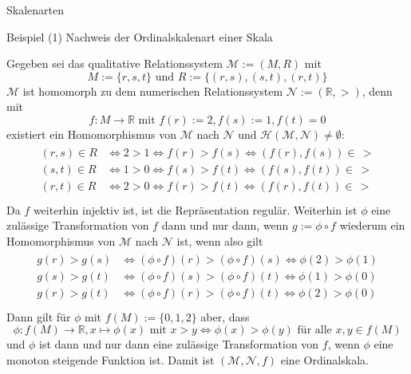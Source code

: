 \documentclass[
  8pt,
  ignorenonframetext,
]{beamer}
\begin{document}
\begin{frame}{Skalenarten}
\protect\hypertarget{skalenarten-2}{}
\vspace{1mm}
\small

Beispiel (1) Nachweis der Ordinalskalenart einer Skala

\footnotesize
{}

Gegeben sei das qualitative Relationssystem \(\mathcal{M} := (M,R)\) mit
\begin{equation}
M := \{r,s,t\} \mbox{ und } R := \{(r,s),(s,t),(r,t)\}
\end{equation} \(\mathcal{M}\) ist homomorph zu dem numerischen
Relationssystem \(\mathcal{N} := (\mathbb{R},>)\), denn mit
\begin{equation}
f : M \to \mathbb{R} \mbox{ mit } f(r) := 2, f(s) := 1, f(t) = 0
\end{equation} existiert ein Homomorphismus von \(\mathcal{M}\) nach
\(\mathcal{N}\) und
\(\mathcal{H}(\mathcal{M},\mathcal{N})\neq \emptyset\): \begin{align}
\begin{split}
(r,s) \in R & \Leftrightarrow 2 > 1 \Leftrightarrow f(r) > f(s) \Leftrightarrow (f(r), f(s)) \in\, > \\
(s,t) \in R & \Leftrightarrow 1 > 0 \Leftrightarrow f(s) > f(t) \Leftrightarrow (f(s), f(t)) \in\, > \\
(r,t) \in R & \Leftrightarrow 2 > 0 \Leftrightarrow f(r) > f(t) \Leftrightarrow (f(r), f(t)) \in\, > \\
\end{split}
\end{align} Da \(f\) weiterhin injektiv ist, ist die Repräsentation
regulär. Weiterhin ist \(\phi\) eine zulässige Transformation von \(f\)
dann und nur dann, wenn \(g := \phi \circ f\) wiederum ein
Homomorphismus von \(\mathcal{M}\) nach \(\mathcal{N}\) ist, wenn also
gilt \begin{align}
\begin{split}
g(r) > g(s) & \Leftrightarrow (\phi \circ f)(r) > (\phi \circ f)(s) \Leftrightarrow \phi(2) > \phi(1) \\
g(s) > g(t) & \Leftrightarrow (\phi \circ f)(s) > (\phi \circ f)(t) \Leftrightarrow \phi(1) > \phi(0) \\
g(r) > g(t) & \Leftrightarrow (\phi \circ f)(r) > (\phi \circ f)(t) \Leftrightarrow \phi(2) > \phi(0) \\
\end{split}
\end{align} Dann gilt für \(\phi\) mit \(f(M) := \{0,1,2\}\) aber, dass
\begin{equation}
\phi : f(M) \to \mathbb{R}, x \mapsto \phi(x)  \mbox{ mit } x > y \Leftrightarrow \phi(x) > \phi(y) \mbox{ für alle } x,y \in f(M)
\end{equation} und \(\phi\) ist dann und nur dann eine zulässige
Transformation von \(f\), wenn \(\phi\) eine monoton steigende Funktion
ist. Damit ist \((\mathcal{M}, \mathcal{N},f)\) eine Ordinalskala.
\end{frame}
\end{document}

